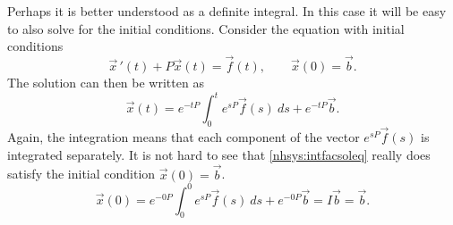 \documentclass[12pt]{book}
\begin{document}
Perhaps it is better understood as a definite integral.  In this case
it will be easy to also solve for the initial conditions.
Consider the
equation with initial conditions
\begin{equation*}
{\vec{x}\,}'(t) + P\vec{x}(t) = \vec{f}(t) ,
\qquad \vec{x}(0) = \vec{b} .
\end{equation*}
The solution can then be written as
\begin{equation} \label{nhsys:intfacsoleq}
\boxed{~~
\vec{x}(t) = e^{-tP} \int_0^t e^{sP}\vec{f}(s) ~ ds + e^{-tP} \vec{b} .
~~}
\end{equation}
Again, the integration means that each component of the vector 
$e^{sP}\vec{f}(s)$ is integrated separately.
It is not hard to see that \eqref{nhsys:intfacsoleq} really does satisfy the
initial condition $\vec{x}(0) = \vec{b}$.
\begin{equation*}
\vec{x}(0) = e^{-0P} \int_0^0 e^{sP}\vec{f}(s) ~ ds + e^{-0P} \vec{b}
= I \vec{b} = \vec{b} .
\end{equation*}
\end{document}

